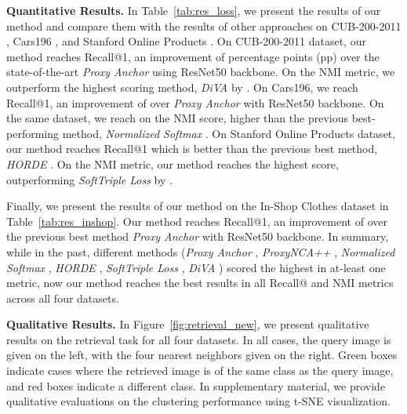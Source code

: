 \documentclass{article}
\begin{document}
\noindent\textbf{Quantitative Results.}
In Table~\ref{tab:res_loss}, we present the results of our method and compare
them with the results of other approaches on CUB-200-2011 \cite{WahCUB_200_2011}, Cars196 \cite{KrauseStarkDengFei-Fei_3DRR2013}, and Stanford Online Products \cite{DBLP:conf/cvpr/SongXJS16}. 
On CUB-200-2011 dataset, our method reaches  Recall@1, an improvement of  percentage points (pp) over the state-of-the-art \textit{Proxy Anchor} \cite{DBLP:conf/cvpr/KimKCK20} using ResNet50 backbone. On the NMI metric, we outperform the highest scoring method, \textit{DiVA} \cite{DBLP:conf/eccv/MilbichRBSBOC20} by . On Cars196, we reach  Recall@1, an improvement of  over \textit{Proxy Anchor} \cite{DBLP:conf/cvpr/KimKCK20} with ResNet50 backbone. On the same dataset, we reach  on the NMI score,  higher than the previous best-performing method, \textit{Normalized Softmax} \cite{DBLP:journals/corr/abs-1811-12649}. On Stanford Online Products dataset, our method reaches  Recall@1 which is  better than the previous best method, \textit{HORDE} \cite{DBLP:journals/corr/abs-1908-02735}. On the NMI metric, our method reaches the highest score, outperforming \textit{SoftTriple Loss} \cite{DBLP:journals/corr/abs-1909-05235} by . 

Finally, we present the results of our method on the In-Shop Clothes dataset in Table~\ref{tab:res_inshop}. Our method reaches  Recall@1, an improvement of  over the previous best method \textit{Proxy Anchor} \cite{DBLP:conf/cvpr/KimKCK20} with ResNet50 backbone. In summary, while in the past, different methods (\textit{Proxy Anchor} \cite{DBLP:conf/cvpr/KimKCK20}, \textit{ProxyNCA++} \cite{DBLP:journals/corr/abs-2004-01113}, \textit{Normalized Softmax} \cite{DBLP:journals/corr/abs-1811-12649}, \textit{HORDE} \cite{DBLP:journals/corr/abs-1908-02735}, \textit{SoftTriple Loss} \cite{DBLP:journals/corr/abs-1909-05235}, \textit{DiVA} \cite{DBLP:conf/eccv/MilbichRBSBOC20}) scored the highest in at-least one metric, now our method reaches the best results in all Recall@ and NMI metrics across all four datasets. 

\noindent\textbf{Qualitative Results.}
In Figure~\ref{fig:retrieval_new}, we present qualitative results on the retrieval task for all four datasets. In all cases, the query image is given on the left, with the four nearest neighbors given on the right. Green boxes indicate cases where the retrieved image is of the same class as the query image, and red boxes indicate a different class. In supplementary material, we provide qualitative evaluations on the clustering performance using t-SNE \cite{DBLP:journals/ml/MaatenH12} visualization.
\end{document}
